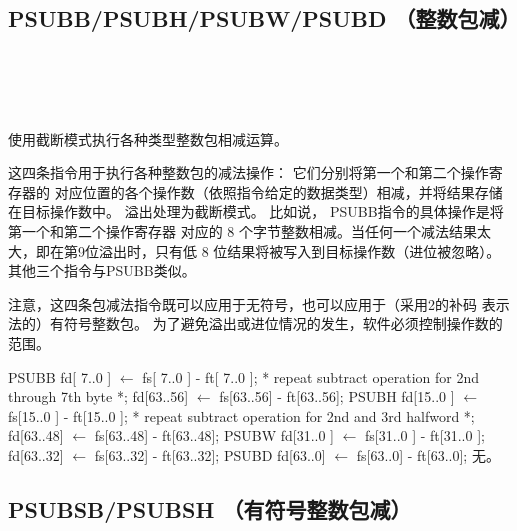 \subsection{PSUBB/PSUBH/PSUBW/PSUBD （整数包减）}

\begin{instructionblk}
   \\
   \\
   \\
   \\
  {使用截断模式执行各种类型整数包相减运算。}
  {这四条指令用于执行各种整数包的减法操作： 它们分别将第一个和第二个操作寄存器的
  对应位置的各个操作数（依照指令给定的数据类型）相减，并将结果存储在目标操作数中。
  溢出处理为截断模式。 比如说， PSUBB指令的具体操作是将第一个和第二个操作寄存器
  对应的 8 个字节整数相减。当任何一个减法结果太大，即在第9位溢出时，只有低 8
  位结果将被写入到目标操作数（进位被忽略）。其他三个指令与PSUBB类似。
  
  注意，这四条包减法指令既可以应用于无符号，也可以应用于（采用2的补码
  表示法的）有符号整数包。 为了避免溢出或进位情况的发生，软件必须控制操作数的范围。}
  {PSUBB \narrownewline
  fd[ 7..0 ]  $\leftarrow$ fs[ 7..0 ] - ft[ 7..0 ]; \narrownewline
  * repeat subtract operation for 2nd through 7th byte *; \narrownewline
  fd[63..56] $\leftarrow$ fs[63..56] - ft[63..56]; \narrownewline \narrownewline
  PSUBH \narrownewline
  fd[15..0 ] $\leftarrow$ fs[15..0 ] - ft[15..0 ]; \narrownewline
  * repeat subtract operation for 2nd and 3rd halfword *; \narrownewline
  fd[63..48] $\leftarrow$ fs[63..48] - ft[63..48]; \narrownewline \narrownewline
  PSUBW \narrownewline
  fd[31..0 ] $\leftarrow$ fs[31..0 ] - ft[31..0 ]; \narrownewline
  fd[63..32] $\leftarrow$ fs[63..32] - ft[63..32]; \narrownewline \narrownewline
  PSUBD \narrownewline
  fd[63..0] $\leftarrow$ fs[63..0] - ft[63..0];}
  {无。}
\end{instructionblk}

\subsection{PSUBSB/PSUBSH （有符号整数包减）}

